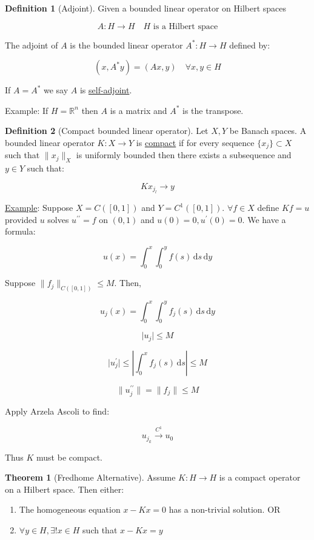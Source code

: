 \documentclass{article}
\theoremstyle{definition}
\newtheorem{definition}{Definition}
\newtheorem{theorem}{Theorem}
\begin{document}
\begin{definition}
    [Adjoint]

    Given a bounded linear operator on Hilbert spaces

    \[
        A: H \to H \quad H \text{ is a Hilbert space} 
    \]

    The adjoint of \(A\) is the bounded linear operator \(A^{\ast}: H \to H\) defined by:

    \[
        (x, A^{\ast} y) = (Ax, y) \quad \forall x,y\in H
    \]

    If \(A = A^{\ast}\) we say \(A\) is \underline{self-adjoint}.

    Example: If \(H = \mathbb{R}^n\) then \(A\) is a matrix and \(A^{\ast}\) is the transpose. 
\end{definition}

\begin{definition}
    [Compact bounded linear operator]

    Let \(X,Y\) be Banach spaces. A bounded linear operator \(K: X \to Y\) is \underline{compact} if for every sequence \(\{ x_j \} \subset X\) such that \(\lVert x_j \rVert _X\) is uniformly bounded then there exists a subsequence and \(y\in Y\) such that:

    \[
        K x_{j_l} \to y
    \]
\end{definition}

\underline{Example}: Suppose \(X = C([0,1])\) and \(Y = C^1([0,1])\). \(\forall f\in X\) define \(Kf = u\) provided \(u\) solves \(u^{\prime\prime} = f\) on \((0,1)\) and \(u(0)=0, u^{\prime} (0)=0\). We have a formula:

\[
    u(x) = \int_{0}^{x} \int_{0}^{y} f(s) \,\mathrm{d}s  \,\mathrm{d}y 
\]

Suppose \(\lVert f_j \rVert _{C([0,1])} \leq M\). Then,

\[
    u_j(x) = \int_{0}^{x} \int_{0}^{y} f_j(s) \,\mathrm{d}s  \,\mathrm{d}y 
\]

\[
    \vert u_j \vert \leq M
\]

\[
    \vert u_j^{\prime}  \vert \leq \left\vert \int_{0}^{x} f_j(s) \,\mathrm{d}s \right\vert \leq M
\]

\[
    \lVert u_j^{\prime\prime} \rVert = \lVert f_j \rVert \leq M
\]

Apply Arzela Ascoli to find:

\[
    u_{j_k} \overset{C^1}{\to} u_0
\]

Thus \(K\) must be compact.

\begin{theorem}
    [Fredhome Alternative]

    Assume \(K: H\to H\) is a compact operator on a Hilbert space. Then either:

    \begin{enumerate}[label=\roman*)]
        \item The homogeneous equation \(x - K x = 0\) has a non-trivial solution. OR
        \item \(\forall y\in H, \exists ! x\in H\) such that \(x - K x = y\)  
    \end{enumerate} 
\end{theorem}
\end{document}
